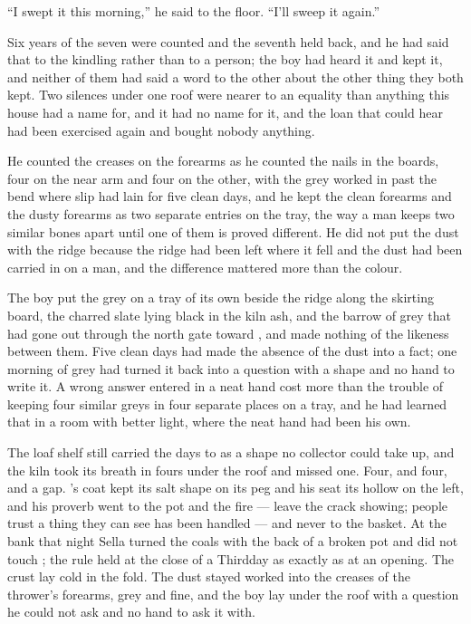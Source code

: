“I swept it this morning,” he said to the floor. “I'll sweep it again.”

Six years of the seven were counted and the seventh held back, and he had said that to the kindling rather than to a person; the boy had heard it and kept it, and neither of them had said a word to the other about the other thing they both kept. Two silences under one roof were nearer to an equality than anything this house had a name for, and it had no name for it, and the loan that could hear had been exercised again and bought nobody anything.

He counted the creases on the forearms as he counted the nails in the boards, four on the near arm and four on the other, with the grey worked in past the bend where slip had lain for five clean days, and he kept the clean forearms and the dusty forearms as two separate entries on the tray, the way a man keeps two similar bones apart until one of them is proved different. He did not put the dust with the ridge because the ridge had been left where it fell and the dust had been carried in on a man, and the difference mattered more than the colour.

The boy put the grey on a tray of its own beside the ridge along the skirting board, the charred slate lying black in the kiln ash, and the barrow of grey that had gone out through the north gate toward , and made nothing of the likeness between them. Five clean days had made the absence of the dust into a fact; one morning of grey had turned it back into a question with a shape and no hand to write it. A wrong answer entered in a neat hand cost more than the trouble of keeping four similar greys in four separate places on a tray, and he had learned that in a room with better light, where the neat hand had been his own.

The loaf shelf still carried the days to  as a shape no collector could take up, and the kiln took its breath in fours under the roof and missed one. Four, and four, and a gap. 's coat kept its salt shape on its peg and his seat its hollow on the left, and his proverb went to the pot and the fire --- leave the crack showing; people trust a thing they can see has been handled --- and never to the basket. At the bank that night Sella turned the coals with the back of a broken pot and did not touch ; the rule held at the close of a Thirdday as exactly as at an opening. The crust lay cold in the fold. The dust stayed worked into the creases of the thrower's forearms, grey and fine, and the boy lay under the roof with a question he could not ask and no hand to ask it with.

